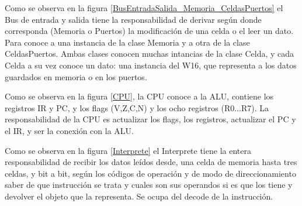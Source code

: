 
Como se observa en la figura \ref{BusEntradaSalida_Memoria_CeldasPuertos} el Bus de entrada y salida tiene la responsabilidad de derivar según donde corresponda (Memoria o Puertos) la modificación de una celda o el leer un dato. Para conoce a una instancia de la clase Memoria y a otra de la clase CeldasPuertos. 
Ambas clases conocen muchas intancias de la clase Celda, y cada Celda a su vez conoce un dato: una instancia del W16, que representa a los datos guardados en memoria o en los puertos.  


Como se observa en la figura \ref{CPU}, la CPU conoce a la ALU, contiene los registros IR y PC, y los flags (V,Z,C,N) y los ocho registros (R0...R7). La responsabilidad de la CPU es actualizar los flags, los registros, actualizar el PC y el IR, y ser la conexión con la ALU.


Como se observa en la figura \ref{Interprete} el Interprete tiene la entera responsabilidad de recibir los datos leídos desde, una celda de memoria hasta tres celdas, y bit a bit, según los códigos de operación y de modo de direccionamiento saber de que instrucción se trata y cuales son sus operandos si es que los tiene y devolver el objeto que la representa. Se ocupa del decode de la instrucción.


